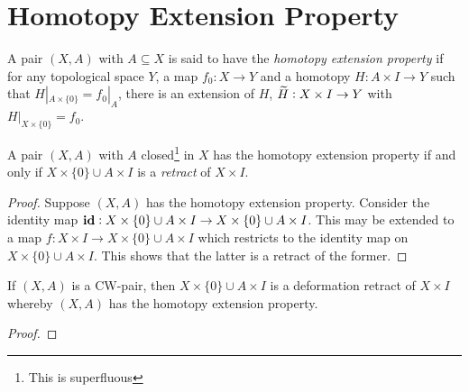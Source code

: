 \section{Homotopy Extension Property}

\begin{definition}
    A pair $(X,A)$ with $A\subseteq X$ is said to have the \emph{homotopy extension property} if for any topological space $Y$, a map $f_0: X\to Y$ and a homotopy $H: A\times I\to Y$ such that $H|_{A\times\{0\}} = f_0|_A$, there is an extension of $H$, $\widetilde{H}: X\times I\to Y$ with $H|_{X\times\{0\}} = f_0$.
\end{definition}

\begin{proposition}
    A pair $(X,A)$ with $A$ closed\footnote{This is superfluous} in $X$ has the homotopy extension property if and only if $X\times\{0\}\cup A\times I$ is a \emph{retract} of $X\times I$.
\end{proposition}
\begin{proof}
    Suppose $(X,A)$ has the homotopy extension property. Consider the identity map $\mathbf{id}: X\times\{0\}\cup A\times I\to X\times\{0\}\cup A\times I$. This may be extended to a map $f: X\times I\to X\times\{0\}\cup A\times I$ which restricts to the identity map on $X\times\{0\}\cup A\times I$. This shows that the latter is a retract of the former.
\end{proof}

\begin{proposition}
    If $(X,A)$ is a CW-pair, then $X\times\{0\}\cup A\times I$ is a deformation retract of $X\times I$ whereby $(X,A)$ has the homotopy extension property.
\end{proposition}
\begin{proof}
\end{proof}


